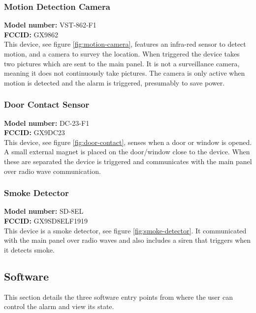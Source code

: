 \subsubsection{Motion Detection Camera}
\textbf{Model number:} VST-862-F1 \\
\textbf{FCCID:} GX9862 \\
This device, see figure \ref{fig:motion-camera}, features an infra-red sensor to detect motion, and a camera to survey the location. When triggered the device takes two pictures which are sent to the main panel. It is not a surveillance camera, meaning it does not continuously take pictures. The camera is only active when motion is detected and the alarm is triggered, presumably to save power.

\subsubsection{Door Contact Sensor}
\textbf{Model number:} DC-23-F1 \\
\textbf{FCCID:} GX9DC23 \\
This device, see figure \ref{fig:door-contact}, senses when a door or window is opened. A small external magnet is placed on the door/window close to the device. When these are separated the device is triggered and communicates with the main panel over radio wave communication.

\subsubsection{Smoke Detector}
\textbf{Model number:} SD-8EL \\
\textbf{FCCID:} GX9SD8ELF1919 \\
This device is a smoke detector, see figure \ref{fig:smoke-detector}. It communicated with the main panel over radio waves and also includes a siren that triggers when it detects smoke.

\subsection{Software} \label{ch:system:software}
This section details the three software entry points from where the user can control the alarm and view its state.

